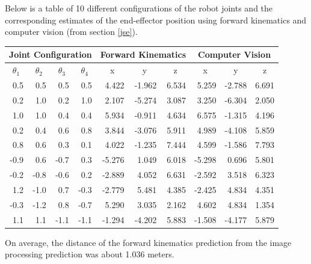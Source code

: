 \documentclass[11pt]{article}
\begin{document}
Below is a table of 10 different configurations of the robot joints and the corresponding estimates of the end-effector position using forward kinematics and computer vision (from section \ref{jse}).

\begin{center}
    \begin{tabular}{ |r|r|r|r||r|r|r|r|r|r|} \hline
        \multicolumn{4}{|c||}{Joint Configuration} & \multicolumn{3}{|c|}{Forward Kinematics} & \multicolumn{3}{|c|}{Computer Vision} \\ \hline
        \multicolumn{1}{|c|}{$\theta_1$} & \multicolumn{1}{|c|}{$\theta_2$} & \multicolumn{1}{|c|}{$\theta_3$} & \multicolumn{1}{|c||}{$\theta_4$} & \multicolumn{1}{|c|}{x} & \multicolumn{1}{|c|}{y} & \multicolumn{1}{|c|}{z} & \multicolumn{1}{|c|}{x} & \multicolumn{1}{|c|}{y} & \multicolumn{1}{|c|}{z} \\ \hline
         0.5 &  0.5 &  0.5 &  0.5 &  4.422 & -1.962 & 6.534 & 5.259 & -2.788 & 6.691 \\
         0.2 &  1.0 &  0.2 &  1.0 &  2.107 & -5.274 & 3.087 & 3.250 & -6.304 & 2.050 \\
         1.0 &  1.0 &  0.4 &  0.4 &  5.934 & -0.911 & 4.634 & 6.575 & -1.315 & 4.196 \\
         0.2 &  0.4 &  0.6 &  0.8 &  3.844 & -3.076 & 5.911 & 4.989 & -4.108 & 5.859 \\
         0.8 &  0.6 &  0.3 &  0.1 &  4.022 & -1.235 & 7.444 & 4.599 & -1.586 & 7.793 \\
        -0.9 &  0.6 & -0.7 &  0.3 & -5.276 &  1.049 & 6.018 & -5.298 & 0.696 & 5.801 \\
        -0.2 & -0.8 & -0.6 &  0.2 & -2.889 &  4.052 & 6.631 & -2.592 & 3.518 & 6.323 \\
         1.2 & -1.0 &  0.7 & -0.3 & -2.779 &  5.481 & 4.385 & -2.425 & 4.834 & 4.351 \\
        -0.3 & -1.2 &  0.8 & -0.7 &  5.290 &  3.035 & 2.162 & 4.602 & 4.834 & 1.354  \\
         1.1 &  1.1 & -1.1 & -1.1 & -1.294 & -4.202 & 5.883 & -1.508 & -4.177 & 5.879 \\ \hline
    \end{tabular}
\end{center}

On average, the distance of the forward kinematics prediction from the image processing prediction was about 1.036 meters.
\end{document}
